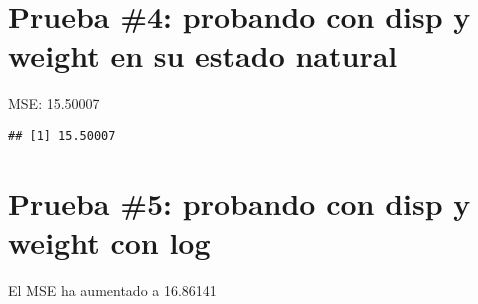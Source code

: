 \documentclass[]{article}
\newenvironment{Shaded}{\begin{snugshade}}{\end{snugshade}}
\newcommand{\CommentTok}[1]{\textcolor[rgb]{0.56,0.35,0.01}{\textit{#1}}}
\newcommand{\DataTypeTok}[1]{\textcolor[rgb]{0.13,0.29,0.53}{#1}}
\newcommand{\DecValTok}[1]{\textcolor[rgb]{0.00,0.00,0.81}{#1}}
\newcommand{\KeywordTok}[1]{\textcolor[rgb]{0.13,0.29,0.53}{\textbf{#1}}}
\newcommand{\NormalTok}[1]{#1}
\newcommand{\OperatorTok}[1]{\textcolor[rgb]{0.81,0.36,0.00}{\textbf{#1}}}
\newcommand{\StringTok}[1]{\textcolor[rgb]{0.31,0.60,0.02}{#1}}
\begin{document}
\hypertarget{prueba-4-probando-con-disp-y-weight-en-su-estado-natural}{%
\section{Prueba \#4: probando con disp y weight en su estado
natural}\label{prueba-4-probando-con-disp-y-weight-en-su-estado-natural}}

MSE: 15.50007

\begin{Shaded}
\end{Shaded}

\begin{verbatim}
## [1] 15.50007
\end{verbatim}

\hypertarget{prueba-5-probando-con-disp-y-weight-con-log}{%
\section{Prueba \#5: probando con disp y weight con
log}\label{prueba-5-probando-con-disp-y-weight-con-log}}

El MSE ha aumentado a 16.86141
\end{document}
